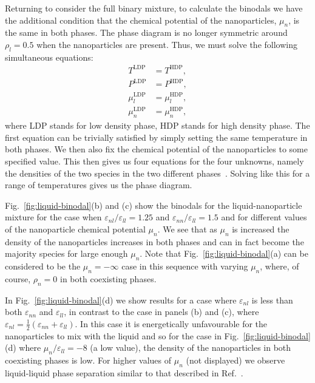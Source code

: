 \documentclass[journal=langd5,manuscript=article]{achemso}
\def\e{\varepsilon}
\begin{document}
Returning to consider the full binary mixture, to calculate the
binodals we have the additional condition that the chemical
potential of the nanoparticles, $\mu_n$, is the same in both phases. The
phase diagram is no longer symmetric around $\rho_l=0.5$ when the
nanoparticles are present. Thus, we must solve the following
simultaneous equations:
%
\begin{align}
  T^{\text{LDP}} &= T^{\text{HDP}}, \\
  P^{\text{LDP}} &= P^{\text{HDP}}, \\
  \mu_l^{\text{LDP}} &= \mu_l^{\text{HDP}}, \\
  \mu_n^{\text{LDP}} &= \mu_n^{\text{HDP}},
\end{align}
%
where LDP stands for low density phase, HDP stands for high density
phase. The first equation can be trivially satisfied by simply setting
the same temperature in both phases. We then also fix the chemical
potential of the nanoparticles to some specified value. This then gives
us four equations for the four unknowns, namely the densities of the two
species in the two different phases~\cite{robbins2011}. Solving like
this for a range of temperatures gives us the phase diagram.

{Fig.~\ref{fig:liquid-binodal}(b)} and {(c)} show the binodals for the liquid-nanoparticle mixture for the case when $\e_{nl}/\e_{ll} = 1.25$ and $\e_{nn}/\e_{ll} = 1.5$ and for different values of the nanoparticle chemical potential $\mu_n$. We see that as $\mu_n$ is increased the density of the nanoparticles increases in both phases and can in fact become the majority species for large enough $\mu_n$. Note that Fig.~\ref{fig:liquid-binodal}{(a)} can be considered to be the $\mu_n =-\infty$ case in this sequence with varying $\mu_n$, where, of course, $\rho_n = 0$ in both coexisting phases.

In Fig.~{\ref{fig:liquid-binodal}(d)} we show results for a case where
$\e_{nl}$ is less than both $\e_{nn}$ and $\e_{ll}$, in contrast to the
case in {panels (b) and (c)}, where
$\e_{nl} = \frac12(\e_{nn} + \e_{ll})$. In this case it is energetically
unfavourable for the nanoparticles to mix with the liquid
and so for the case in {Fig.~\ref{fig:liquid-binodal}(d)} where
$\mu_n/\e_{ll} = -8$ (a low value), the density of the nanoparticles in
both coexisting phases is low. For higher values of $\mu_n$ (not
displayed) we observe liquid-liquid phase separation similar to that
described in Ref.~.

\end{document}
